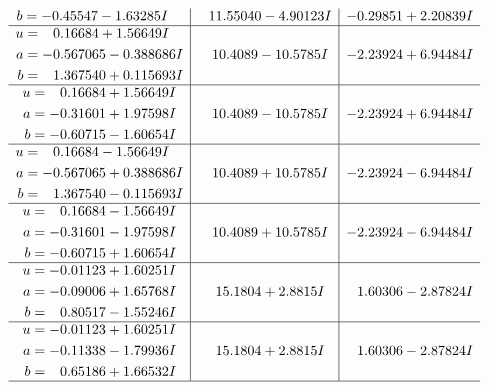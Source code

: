 \documentclass[1p]{elsarticle_modified}
\theoremstyle{definition}
\begin{document}
$$\begin{array}{c|c|c}
\begin{aligned}
b &= -0.45547 - 1.63285 I\end{aligned}
 & \phantom{-}11.55040 - 4.90123 I & -0.29851 + 2.20839 I \\ \hline\begin{aligned}
u &= \phantom{-}0.16684 + 1.56649 I \\
a &= -0.567065 - 0.388686 I \\
b &= \phantom{-}1.367540 + 0.115693 I\end{aligned}
 & \phantom{-}10.4089 - 10.5785 I & -2.23924 + 6.94484 I \\ \hline\begin{aligned}
u &= \phantom{-}0.16684 + 1.56649 I \\
a &= -0.31601 + 1.97598 I \\
b &= -0.60715 - 1.60654 I\end{aligned}
 & \phantom{-}10.4089 - 10.5785 I & -2.23924 + 6.94484 I \\ \hline\begin{aligned}
u &= \phantom{-}0.16684 - 1.56649 I \\
a &= -0.567065 + 0.388686 I \\
b &= \phantom{-}1.367540 - 0.115693 I\end{aligned}
 & \phantom{-}10.4089 + 10.5785 I & -2.23924 - 6.94484 I \\ \hline\begin{aligned}
u &= \phantom{-}0.16684 - 1.56649 I \\
a &= -0.31601 - 1.97598 I \\
b &= -0.60715 + 1.60654 I\end{aligned}
 & \phantom{-}10.4089 + 10.5785 I & -2.23924 - 6.94484 I \\ \hline\begin{aligned}
u &= -0.01123 + 1.60251 I \\
a &= -0.09006 + 1.65768 I \\
b &= \phantom{-}0.80517 - 1.55246 I\end{aligned}
 & \phantom{-}15.1804 + 2.8815 I & \phantom{-}1.60306 - 2.87824 I \\ \hline\begin{aligned}
u &= -0.01123 + 1.60251 I \\
a &= -0.11338 - 1.79936 I \\
b &= \phantom{-}0.65186 + 1.66532 I\end{aligned}
 & \phantom{-}15.1804 + 2.8815 I & \phantom{-}1.60306 - 2.87824 I\\
 \hline 
 \end{array}$$\newpage$$\begin{array}{c|c|c}  

\end{array}$$
\end{document}
